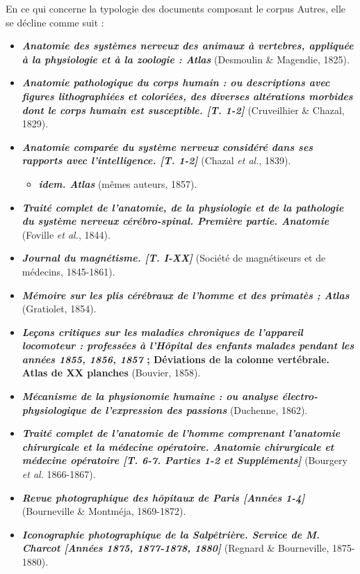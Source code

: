 \bigskip
En ce qui concerne la typologie des documents composant le corpus Autres, elle se décline comme suit :
\begin{itemize}
	\item \textbf{\textit{Anatomie des systèmes nerveux des animaux à vertebres, appliquée à la physiologie et à la zoologie : Atlas}} (Desmoulin \& Magendie, 1825).
	\item \textbf{\textit{Anatomie pathologique du corps humain : ou descriptions avec figures lithographiées et coloriées, des diverses altérations morbides dont le corps humain est susceptible. [T. 1-2]}} (Cruveilhier \& Chazal, 1829).
	\item \textbf{\textit{Anatomie comparée du système nerveux considéré dans ses rapports avec l'intelligence. [T. 1-2]}} (Chazal \textit{et al.}, 1839).
	\begin{itemize}
		\item \textit{\textbf{idem. Atlas}} (mêmes auteurs, 1857).
	\end{itemize}
	\item \textbf{\textit{Traité complet de l'anatomie, de la physiologie et de la pathologie du système nerveux cérébro-spinal. Première partie. Anatomie}} (Foville \textit{et al.}, 1844).
	\item \textbf{\textit{Journal du magnétisme. [T. I-XX]}} (Société de magnétiseurs et de médecins, 1845-1861).
	\item \textbf{\textit{Mémoire sur les plis cérébraux de l'homme et des primatès ; Atlas}} (Gratiolet, 1854).
	\item \textbf{\textit{Leçons critiques sur les maladies chroniques de l'appareil locomoteur : professées à l'Hôpital des enfants malades pendant les années 1855, 1856, 1857} ; Déviations de la colonne vertébrale. Atlas de XX planches} (Bouvier, 1858).
	\item \textbf{\textit{Mécanisme de la physionomie humaine : ou analyse électro-physiologique de l'expression des passions}} (Duchenne, 1862).
	\item \textbf{\textit{Traité complet de l'anatomie de l'homme comprenant l'anatomie chirurgicale et la médecine opératoire. Anatomie chirurgicale et médecine opératoire [T. 6-7. Parties 1-2 et Suppléments]}} (Bourgery \textit{et al.} 1866-1867).
	\item \textbf{\textit{Revue photographique des hôpitaux de Paris [Années 1-4]}} (Bourneville \& Montméja, 1869-1872).
	\item \textbf{\textit{Iconographie photographique de la Salpêtrière. Service de M. Charcot [Années 1875, 1877-1878, 1880]}} (Regnard \& Bourneville, 1875-1880).

\end{itemize}
